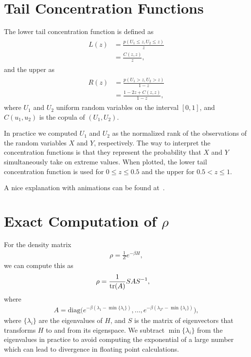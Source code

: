 \section{Tail Concentration Functions}\label{app:tail_concentration_functions}
The lower tail concentration function is defined as~\cite{venter_2002}
\begin{align}
\begin{split}
    L(z)
        &= \frac{p(U_1 \le z, U_2 \le z)}{z} \\
        &= \frac{C(z,z)}{z},
\end{split}
\end{align}
and the upper as
\begin{align}
\begin{split}
    R(z)
        &= \frac{p(U_1 > z, U_2 > z)}{1-z} \\
        &= \frac{1 - 2z + C(z,z)}{1-z},
\end{split}
\end{align}
where \( U_1 \) and \( U_2 \) uniform random variables on the interval \( [0, 1] \), and \( C(u_1, u_2) \) is the copula of \( (U_1, U_2) \).

In practice we computed \( U_1 \) and \( U_2 \) as the normalized rank of the observations of the random variables \( X \) and \( Y \), respectively.
The way to interpret the concentration functions is that they represent the probability that \( X \) and \( Y \) simultaneously take on extreme values.
When plotted, the lower tail concentration function is used for \( 0 \le z \le 0.5 \) and the upper for \( 0.5 < z \le 1 \).

A nice explanation with animations can be found at~\cite{charpentier_2012}.

\section{Exact Computation of \( \rho \)}\label{app:exact_rho_computation}
For the density matrix
\begin{align}
    \rho = \frac{1}{Z} e^{-\beta H},
\end{align}
we can compute this as
\begin{align}
    \rho
        &= \frac{1}{\text{tr}(A)} S A S^{-1},
\end{align}
where
\begin{align}
    A = \text{diag}\Big(e^{-\beta(\lambda_1 - \min\{\lambda_i\})}, \dots, e^{-\beta(\lambda_{2^n} - \min\{\lambda_i\})}\Big),
\end{align}
where \( \{\lambda_i\} \) are the eigenvalues of \( H \), and \( S \) is the matrix of eigenvectors that transforms \( H \) to and from its eigenspace.
We subtract \( \min\{\lambda_i\} \) from the eigenvalues in practice to avoid computing the exponential of a large number which can lead to divergence in floating point calculations.

